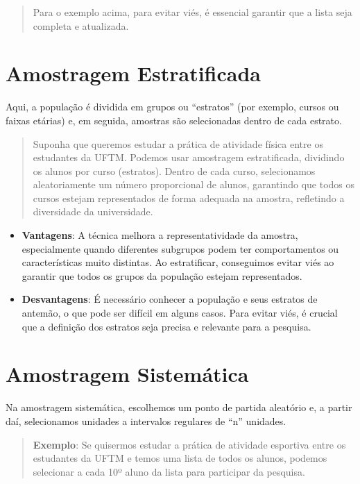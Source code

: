 \documentclass[
]{book}
\providecommand{\tightlist}{%
  \setlength{\itemsep}{0pt}\setlength{\parskip}{0pt}}
\begin{document}
\begin{quote}
Para o exemplo acima, para evitar viés, é essencial garantir que a lista seja completa e atualizada.
\end{quote}

\section{Amostragem Estratificada}\label{amostragem-estratificada}

Aqui, a população é dividida em grupos ou ``estratos'' (por exemplo, cursos ou faixas etárias) e, em seguida, amostras são selecionadas dentro de cada estrato.

\begin{quote}
Suponha que queremos estudar a prática de atividade física entre os estudantes da UFTM. Podemos usar amostragem estratificada, dividindo os alunos por curso (estratos). Dentro de cada curso, selecionamos aleatoriamente um número proporcional de alunos, garantindo que todos os cursos estejam representados de forma adequada na amostra, refletindo a diversidade da universidade.
\end{quote}

\begin{itemize}
\tightlist
\item
  \textbf{Vantagens}: A técnica melhora a representatividade da amostra, especialmente quando diferentes subgrupos podem ter comportamentos ou características muito distintas. Ao estratificar, conseguimos evitar viés ao garantir que todos os grupos da população estejam representados.
\item
  \textbf{Desvantagens}: É necessário conhecer a população e seus estratos de antemão, o que pode ser difícil em alguns casos. Para evitar viés, é crucial que a definição dos estratos seja precisa e relevante para a pesquisa.
\end{itemize}

\section{Amostragem Sistemática}\label{amostragem-sistemuxe1tica}

Na amostragem sistemática, escolhemos um ponto de partida aleatório e, a partir daí, selecionamos unidades a intervalos regulares de ``n'' unidades.

\begin{quote}
\textbf{Exemplo}: Se quisermos estudar a prática de atividade esportiva entre os estudantes da UFTM e temos uma lista de todos os alunos, podemos selecionar a cada 10º aluno da lista para participar da pesquisa.
\end{quote}
\end{document}
